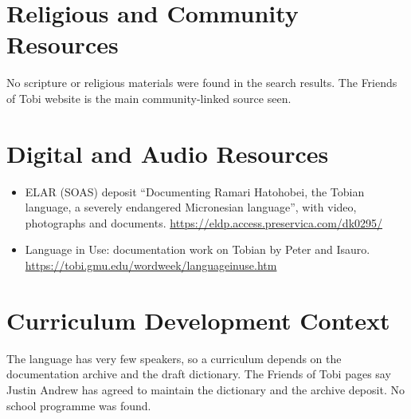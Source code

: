 \documentclass[12pt]{article}
\begin{document}
\section{Religious and Community Resources}
No scripture or religious materials were found in the search results. The Friends of Tobi website is the main community-linked source seen.

\section{Digital and Audio Resources}
\begin{itemize}
\item ELAR (SOAS) deposit ``Documenting Ramari Hatohobei, the Tobian language, a severely endangered Micronesian language'', with video, photographs and documents. \url{https://eldp.access.preservica.com/dk0295/}
\item Language in Use: documentation work on Tobian by Peter and Isauro. \url{https://tobi.gmu.edu/wordweek/languageinuse.htm}
\end{itemize}

\section{Curriculum Development Context}
The language has very few speakers, so a curriculum depends on the documentation archive and the draft dictionary. The Friends of Tobi pages say Justin Andrew has agreed to maintain the dictionary and the archive deposit. No school programme was found.
\end{document}
